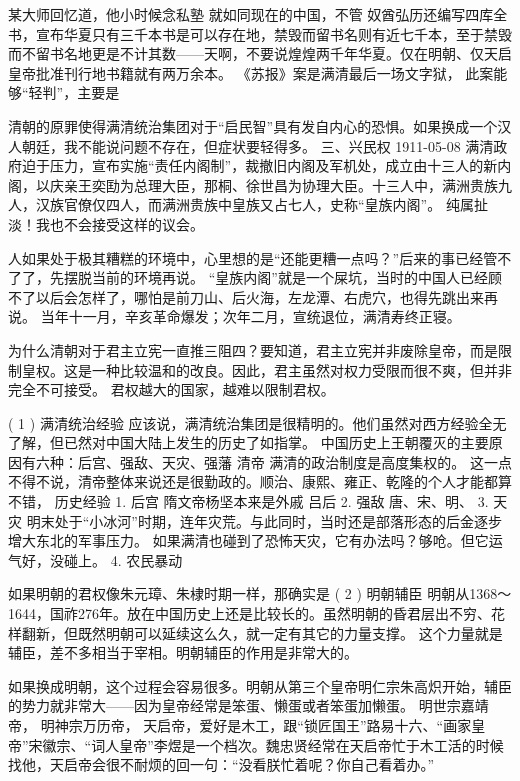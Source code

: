 某大师回忆道，他小时候念私塾
就如同现在的中国，不管
奴酋弘历还编写四库全书，宣布华夏只有三千本书是可以存在地，禁毁而留书名则有近七千本，至于禁毁而不留书名地更是不计其数——天啊，不要说煌煌两千年华夏。仅在明朝、仅天启皇帝批准刊行地书籍就有两万余本。
《苏报》案是满清最后一场文字狱，
此案能够“轻判”，主要是

	清朝的原罪使得满清统治集团对于“启民智”具有发自内心的恐惧。如果换成一个汉人朝廷，我不能说问题不存在，但症状要轻得多。
三、兴民权
1911-05-08
	满清政府迫于压力，宣布实施“责任内阁制”，裁撤旧内阁及军机处，成立由十三人的新内阁，以庆亲王奕劻为总理大臣，那桐、徐世昌为协理大臣。十三人中，满洲贵族九人，汉族官僚仅四人，而满洲贵族中皇族又占七人，史称“皇族内阁”。
纯属扯淡！我也不会接受这样的议会。

	人如果处于极其糟糕的环境中，心里想的是“还能更糟一点吗？”后来的事已经管不了了，先摆脱当前的环境再说。
	“皇族内阁”就是一个屎坑，当时的中国人已经顾不了以后会怎样了，哪怕是前刀山、后火海，左龙潭、右虎穴，也得先跳出来再说。
	当年十一月，辛亥革命爆发；次年二月，宣统退位，满清寿终正寝。

	为什么清朝对于君主立宪一直推三阻四？要知道，君主立宪并非废除皇帝，而是限制皇权。这是一种比较温和的改良。因此，君主虽然对权力受限而很不爽，但并非完全不可接受。
君权越大的国家，越难以限制君权。

( 1 ) 满清统治经验
应该说，满清统治集团是很精明的。他们虽然对西方经验全无了解，但已然对中国大陆上发生的历史了如指掌。
中国历史上王朝覆灭的主要原因有六种：后宫、强敌、天灾、强藩
清帝
满清的政治制度是高度集权的。
这一点不得不说，清帝整体来说还是很勤政的。顺治、康熙、雍正、乾隆的个人才能都算不错，
历史经验
1.  后宫
隋文帝杨坚本来是外戚
吕后
2.  强敌
唐、宋、明、
3.  天灾
明末处于“小冰河”时期，连年灾荒。与此同时，当时还是部落形态的后金逐步增大东北的军事压力。
如果满清也碰到了恐怖天灾，它有办法吗？够呛。但它运气好，没碰上。
4.  农民暴动

如果明朝的君权像朱元璋、朱棣时期一样，那确实是
( 2 ) 明朝辅臣
明朝从1368～1644，国祚276年。放在中国历史上还是比较长的。虽然明朝的昏君层出不穷、花样翻新，但既然明朝可以延续这么久，就一定有其它的力量支撑。
这个力量就是辅臣，差不多相当于宰相。明朝辅臣的作用是非常大的。

如果换成明朝，这个过程会容易很多。明朝从第三个皇帝明仁宗朱高炽开始，辅臣的势力就非常大——因为皇帝经常是笨蛋、懒蛋或者笨蛋加懒蛋。
明世宗嘉靖帝，
明神宗万历帝，
天启帝，爱好是木工，跟“锁匠国王”路易十六、“画家皇帝”宋徽宗、“词人皇帝”李煜是一个档次。魏忠贤经常在天启帝忙于木工活的时候找他，天启帝会很不耐烦的回一句：“没看朕忙着呢？你自己看着办。”

